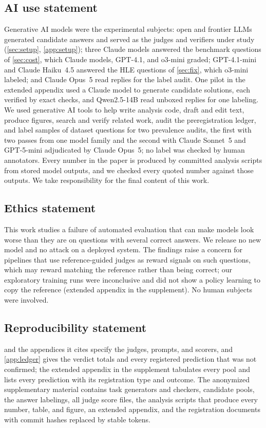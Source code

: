 \documentclass{article}
\begin{document}
\subsection*{AI use statement}
Generative AI models were the experimental subjects: open and frontier LLMs generated candidate answers and served as the judges and verifiers under study (\cref{sec:setup}, \cref{app:setup}); three Claude models answered the benchmark questions of \cref{sec:cost}, which Claude models, GPT-4.1, and o3-mini graded; GPT-4.1-mini and Claude Haiku~4.5 answered the HLE questions of \cref{sec:fix}, which o3-mini labeled; and Claude Opus~5 read replies for the label audit. One pilot in the extended appendix used a Claude model to generate candidate solutions, each verified by exact checks, and Qwen2.5-14B read unboxed replies for one labeling. We used generative AI tools to help write analysis code, draft and edit text, produce figures, search and verify related work, audit the preregistration ledger, and label samples of dataset questions for two prevalence audits, the first with two passes from one model family and the second with Claude Sonnet~5 and GPT-5-mini adjudicated by Claude Opus~5; no label was checked by human annotators. Every number in the paper is produced by committed analysis scripts from stored model outputs, and we checked every quoted number against those outputs. We take responsibility for the final content of this work.

\subsection*{Ethics statement}
This work studies a failure of automated evaluation that can make models look worse than they are on questions with several correct answers. We release no new model and no attack on a deployed system. The findings raise a concern for pipelines that use reference-guided judges as reward signals on such questions, which may reward matching the reference rather than being correct; our exploratory training runs were inconclusive and did not show a policy learning to copy the reference (extended appendix in the supplement). No human subjects were involved.

\subsection*{Reproducibility statement}
 and the appendices it cites specify the judges, prompts, and scorers, and \cref{app:ledger} gives the verdict totals and every registered prediction that was not confirmed; the extended appendix in the supplement tabulates every pool and lists every prediction with its registration type and outcome. The anonymized supplementary material contains task generators and checkers, candidate pools, the answer labelings, all judge score files, the analysis scripts that produce every number, table, and figure, an extended appendix, and the registration documents with commit hashes replaced by stable tokens.




\newpage
\appendix
{}

\end{document}

